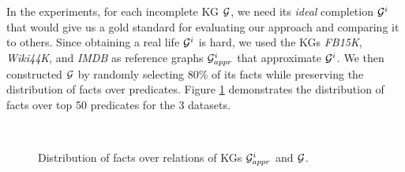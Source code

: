In the experiments, for each incomplete KG $\mathcal{G}$, we need its \emph{ideal} completion $\mathcal{G}^i$ that would give us a gold standard for evaluating our approach and comparing it to others.
Since obtaining a real life $\mathcal{G}^i$ is hard, we used the KGs \textit{FB15K}, \textit{Wiki44K}, and \textit{IMDB} as reference graphs $\mathcal{G}^i_{appr}$ that approximate $\mathcal{G}^i$. 
We then constructed $\mathcal{G}$ by randomly selecting $80\%$ of its facts while preserving the distribution of facts over predicates. Figure \ref{table:pred_distribution} demonstrates the distribution of facts over top 50 predicates for the 3 datasets.

\begin{figure}[t]
     \centering
     \\
     \caption{Distribution of facts over relations of KGs $\mathcal{G}^i_{appr}$ and $\mathcal{G}$.}
     \label{table:pred_distribution}
\end{figure}

